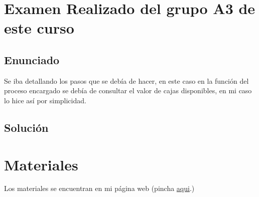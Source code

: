 \documentclass[a4paper,12pt]{article}
\begin{document}
\section{Examen Realizado del grupo A3 de este curso}
\subsection{Enunciado}
Se iba detallando los pasos que se debía de hacer, en este caso en la función del proceso encargado se debía de consultar el valor de cajas disponibles, en mi caso lo hice así por simplicidad.
\subsection{Solución}


\section{Materiales}
Los materiales se encuentran en mi página web (pincha \href{https://github.com/ElblogdeIsmael/ElblogdeIsmael.github.io/tree/main/Subjects/Third/SCD/Examenes/SegundoParcial/ETSIIT/code}{aqui}.)
\end{document}
